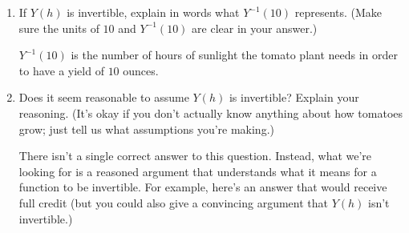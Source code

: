 \documentclass{article}
\renewcommand{\answer}[1]{#1}
\theoremstyle{theorem}
\begin{document}
\begin{enumerate}
\begin{enumerate}
\begin{solution}
    \end{solution}

  \item %

    \begin{problem}[\vfill]
      If $Y(h)$ is invertible, explain in words what $Y^{-1}(10)$ represents. (Make sure the units of $10$ and $Y^{-1}(10)$ are clear in your answer.) 
    \end{problem}

    \begin{solution}
      \answer{$Y^{-1}(10)$ is the number of hours of sunlight the tomato plant needs in order to have a yield of $10$ ounces.}
    \end{solution}

  \item %

    \begin{problem}[\nstretch{1.25}]
      Does it seem reasonable to assume $Y(h)$ is invertible? Explain your reasoning. (It's okay if you don't actually know anything about how tomatoes grow; just tell us what assumptions you're making.) 
    \end{problem}

    \begin{solution}
      There isn't a single correct answer to this question. Instead, what we're looking for is a reasoned argument that understands what it means for a function to be invertible. For example, here's an answer that would receive full credit (but you could also give a convincing argument that $Y(h)$ isn't invertible.)


\end{solution}
\end{enumerate}
\end{enumerate}
\end{document}
